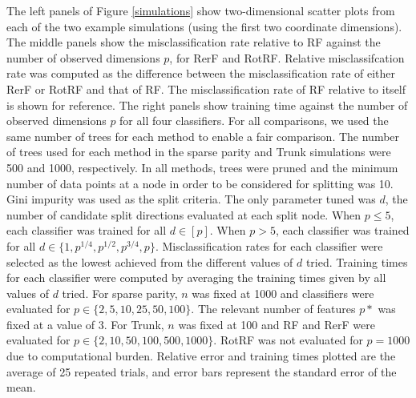 \documentclass[10pt]{article}
\begin{document}
The left panels of Figure \ref{simulations} show two-dimensional scatter plots from each of the two example simulations (using the first two coordinate dimensions). The middle panels show the misclassification rate relative to RF against the number of observed dimensions $p$, for RerF and RotRF. Relative misclassifcation rate was computed as the difference between the misclassification rate of either RerF or RotRF and that of RF. The misclassification rate of RF relative to itself is shown for reference. The right panels show training time against the number of observed dimensions $p$ for all four classifiers. For all comparisons, we used the same number of trees for each method to enable a fair comparison. The number of trees used for each method in the sparse parity and Trunk simulations were 500 and 1000, respectively. In all methods, trees were pruned and the minimum number of data points at a node in order to be considered for splitting was 10. Gini impurity was used as the split criteria. The only parameter tuned was $d$, the number of candidate split directions evaluated at each split node. When $p \leq 5$, each classifier was trained for all $d \in [p]$. When $p > 5$, each classifier was trained for all $d \in \{1,p^{1/4},p^{1/2},p^{3/4},p\}$. Misclassification rates for each classifier were selected as the lowest achieved from the different values of $d$ tried. Training times for each classifier were computed by averaging the training times given by all values of $d$ tried. For sparse parity, $n$ was fixed at 1000 and classifiers were evaluated for $p \in \{2,5,10,25,50,100\}$. The relevant number of features $p*$ was fixed at a value of 3. For Trunk, $n$ was fixed at 100 and RF and RerF were evaluated for $p \in \{2,10,50,100,500,1000\}$. RotRF was not evaluated for $p = 1000$ due to computational burden. Relative error and training times plotted are the average of 25 repeated trials, and error bars represent the standard error of the mean.
\end{document}
